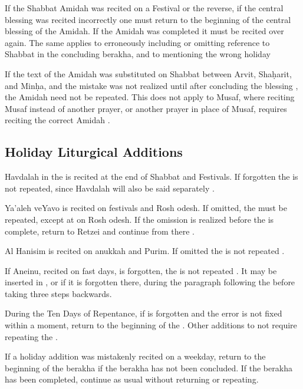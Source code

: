 If the Shabbat Amidah was recited on a Festival or the reverse, if the central blessing was recited incorrectly one must return to the beginning of the central blessing of the Amidah.  If the Amidah was completed it must be recited over again.  The same applies to erroneously including or omitting reference to Shabbat in the concluding berakha, and to mentioning the wrong holiday \parencite*[2:3:4]{PHYT}

If the text of the Amidah was substituted on Shabbat between Arvit, Sha\d{h}arit, and Min\d{h}a, and the mistake was not realized until after concluding the blessing , the Amidah need not be repeated.  This does not apply to Musaf, where reciting Musaf instead of another prayer, or another prayer in place of Musaf, requires reciting the correct Amidah \parencite*[76:21-22]{Kitzur}.

\subsection{Holiday Liturgical Additions}

Havdalah in the \amidah is recited at the end of Shabbat and Festivals.  If forgotten the \amidah is not repeated, since Havdalah will also be said separately \parencite*[18:2 citing OC 422]{PH}.

Ya'aleh veYavo is recited on festivals and Rosh \bigheth odesh.  If omitted, the \amidah must be repeated, except at \arvit\space on Rosh \bigheth odesh.  If the omission is realized before the \amidah is complete, return to Retzei and continue from there \parencite{PH}.

Al Hanisim is recited on \bigheth anukkah and Purim.  If omitted the \amidah is not repeated \parencite*[citing OC 682]{PH}.

If Aneinu, recited on fast days, is forgotten, the \amidah is not repeated \parencite*[citing OC 565]{PH}. It may be inserted in , or if it is forgotten there, during the paragraph following the \amidah before taking three steps backwards.

During the Ten Days of Repentance, if  is forgotten and the error is not fixed within a moment, return to the beginning of the \amidahnospace.  Other additions to not require repeating the \amidahnospace.

If a holiday addition was mistakenly recited on a weekday, return to the beginning of the berakha if the berakha has not been concluded.  If the berakha has been completed, continue as usual without returning or repeating.

